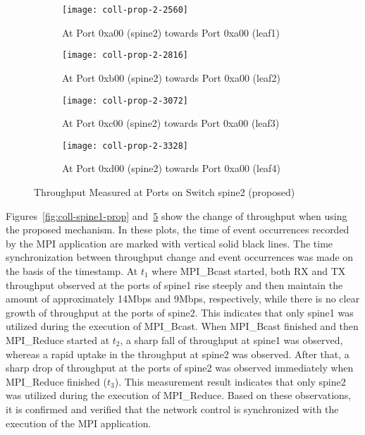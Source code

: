 \begin{figure}
    \begin{subfigure}{.45\linewidth}
        \texttt{[image: coll-prop-2-2560]}
        \caption{At Port 0xa00 (spine2) \newline towards Port 0xa00 (leaf1)}%
        \label{fig:spine2-leaf1-prop}
    \end{subfigure}
    \begin{subfigure}{.45\linewidth}
        \texttt{[image: coll-prop-2-2816]}
        \caption{At Port 0xb00 (spine2) \newline towards Port 0xa00 (leaf2)}%
        \label{fig:spine2-leaf2-prop}
    \end{subfigure}
    \begin{subfigure}{.45\linewidth}
        \texttt{[image: coll-prop-2-3072]}
        \caption{At Port 0xc00 (spine2) \newline towards Port 0xa00 (leaf3)}%
        \label{fig:spine2-leaf3-prop}
    \end{subfigure}
    \begin{subfigure}{.45\linewidth}
        \texttt{[image: coll-prop-2-3328]}
        \caption{At Port 0xd00 (spine2) \newline towards Port 0xa00 (leaf4)}%
        \label{fig:spine2-leaf4-prop}
    \end{subfigure}
    \caption{Throughput Measured at Ports on Switch spine2 (proposed)}%
    \label{fig:coll-spine2-prop}
\end{figure}


Figures~\ref{fig:coll-spine1-prop} and~\ref{fig:coll-spine2-prop} show
the change of throughput when using the proposed mechanism. In these
plots, the time of event occurrences recorded by the MPI application are
marked with vertical solid black lines. The time synchronization between
throughput change and event occurrences was made on the basis of the
timestamp. At \(t_1\) where MPI\_Bcast started, both RX and TX
throughput observed at the ports of spine1 rise steeply and then
maintain the amount of approximately 14Mbps and 9Mbps, respectively,
while there is no clear growth of throughput at the ports of spine2.
This indicates that only spine1 was utilized during the execution of
MPI\_Bcast. When MPI\_Bcast finished and then MPI\_Reduce started at
\(t_2\), a sharp fall of throughput at spine1 was observed, whereas a
rapid uptake in the throughput at spine2 was observed. After that, a
sharp drop of throughput at the ports of spine2 was observed immediately
when MPI\_Reduce finished (\(t_3\)). This measurement result indicates
that only spine2 was utilized during the execution of MPI\_Reduce. Based
on these observations, it is confirmed and verified that the network
control is synchronized with the execution of the MPI application.

